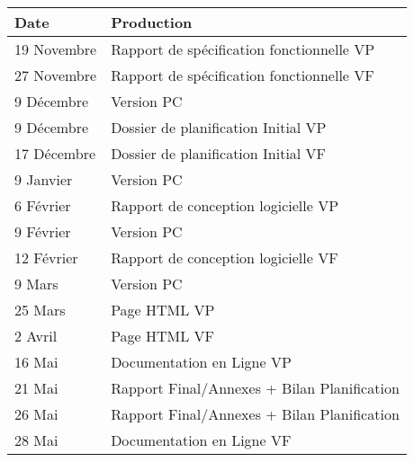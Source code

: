 \begin{tabular}{|l|l|}
\hline
  Date &
  Production \\
\hline
  19 Novembre &
  Rapport de spécification fonctionnelle VP \\
\hline
  27 Novembre &
  Rapport de spécification fonctionnelle VF \\
\hline
  9 Décembre &
  Version PC \textnumero1 \\
\hline
  9 Décembre &
  Dossier de planification Initial VP \\
\hline
  17 Décembre &
  Dossier de planification Initial VF \\
\hline
  9 Janvier &
  Version PC \textnumero2 \\
\hline
  6 Février &
  Rapport de conception logicielle VP \\
\hline
  9 Février &
  Version PC \textnumero3 \\
\hline
  12 Février &
  Rapport de conception logicielle VF \\
\hline
  9 Mars &
  Version PC \textnumero4 \\
\hline
  25 Mars &
  Page HTML VP \\
\hline
  2 Avril &
  Page HTML VF \\
\hline
  16 Mai &
  Documentation en Ligne VP \\
\hline
  21 Mai &
  Rapport Final/Annexes + Bilan Planification \\
\hline
  26 Mai &
  Rapport Final/Annexes + Bilan Planification \\
\hline
  28 Mai &
  Documentation en Ligne VF \\
\hline
\end{tabular}

